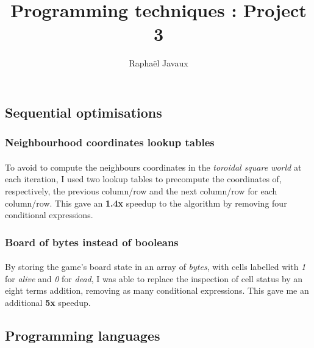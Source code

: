 \documentclass[a4paper]{article}
\title{Programming techniques : Project 3}
\author{Raphaël Javaux}
\date{}
\begin{document}
\maketitle

   \subsection{Sequential optimisations}

   \subsubsection{Neighbourhood coordinates lookup tables}

    \paragraph{}To avoid to compute the neighbours coordinates in the
\textit{toroidal square world} at each iteration, I used two lookup tables to
precompute the coordinates of, respectively, the previous column/row and the
next column/row for each column/row. This gave an \textbf{1.4x} speedup to the
algorithm by removing four conditional expressions.

   \subsubsection{Board of bytes instead of booleans}

   \paragraph{}By storing the game's board state in an array of \textit{bytes},
with cells labelled with \textit{1} for \textit{alive} and \textit{0} for
\textit{dead}, I was able to replace the inspection of cell status by an eight
terms addition, removing as many conditional expressions. This gave me an
additional \textbf{5x} speedup.

  \subsection{Programming languages}
\end{document}
